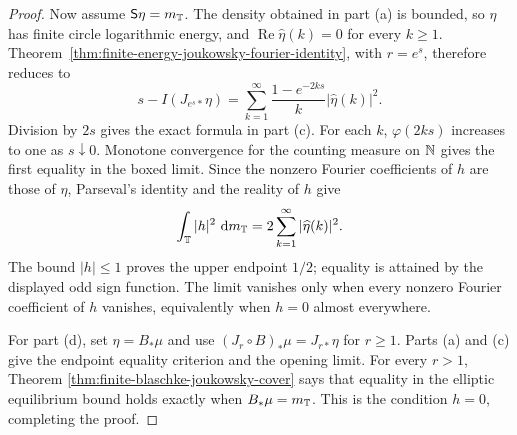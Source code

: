 \begin{proof}
Now assume \(\mathsf S\eta=m_{\mathbb{T}}\).  The density obtained in part
\textup{(a)} is bounded, so \(\eta\) has finite circle logarithmic
energy, and \(\operatorname{Re}\widehat\eta(k)=0\) for every \(k\ge1\).
Theorem~\ref{thm:finite-energy-joukowsky-fourier-identity}, with
\(r=e^s\), therefore reduces to
\[
s-I(J_{e^s\ast}\eta)
=\sum_{k=1}^{\infty}
\frac{1-e^{-2ks}}{k}|\widehat\eta(k)|^2.
\]
Division by \(2s\) gives the exact formula in part \textup{(c)}.  For
each \(k\), \(\varphi(2ks)\) increases to one as \(s\downarrow0\).
Monotone convergence for the counting measure on \(\mathbb{N}\) gives the
first equality in the boxed limit.  Since the nonzero Fourier
coefficients of \(h\) are those of \(\eta\), Parseval's identity and
the reality of \(h\) give
\[
\int_{\mathbb{T}}|h|^2\,\,\mathrm{d} m_{\mathbb{T}}
=2\sum_{k=1}^{\infty}|\widehat\eta(k)|^2.
\]
The bound \(|h|\le1\) proves the upper endpoint \(1/2\); equality is
attained by the displayed odd sign function.  The limit vanishes only
when every nonzero Fourier coefficient of \(h\) vanishes, equivalently
when \(h=0\) almost everywhere.

For part \textup{(d)}, set \(\eta=B_\ast\mu\) and use
\((J_r\circ B)_\ast\mu=J_{r\ast}\eta\) for \(r\ge1\).  Parts
\textup{(a)} and \textup{(c)} give the endpoint equality criterion and
the opening limit.  For every \(r>1\), Theorem
\ref{thm:finite-blaschke-joukowsky-cover} says that equality in the
elliptic equilibrium bound holds exactly when \(B_\ast\mu=m_{\mathbb{T}}\).
This is the condition \(h=0\), completing the proof.
\end{proof}
